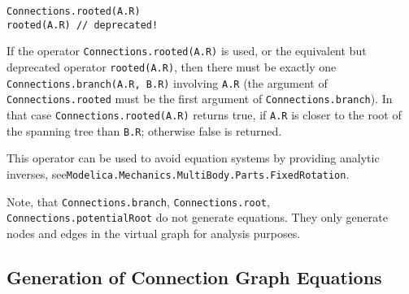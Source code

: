 \begin{operatordefinition}
\begin{synopsis}\begin{lstlisting}
Connections.rooted(A.R)
rooted(A.R) // deprecated!
\end{lstlisting}\end{synopsis}
\begin{semantics}
If the operator \lstinline!Connections.rooted(A.R)! is used, or the equivalent but deprecated operator \lstinline!rooted(A.R)!, then there must be exactly one \lstinline!Connections.branch(A.R, B.R)! involving \lstinline!A.R! (the argument of \lstinline!Connections.rooted! must be the first argument of \lstinline!Connections.branch!).
In that case \lstinline!Connections.rooted(A.R)! returns true, if \lstinline!A.R! is closer to the root of the spanning tree than \lstinline!B.R!; otherwise false is returned.

\begin{nonnormative}
This operator can be used to avoid equation systems by providing analytic inverses, see\linebreak[4] \lstinline!Modelica.Mechanics.MultiBody.Parts.FixedRotation!.
\end{nonnormative}
\end{semantics}
\end{operatordefinition}

\begin{nonnormative}
Note, that \lstinline!Connections.branch!, \lstinline!Connections.root!, \lstinline!Connections.potentialRoot! do not generate equations.
They only generate nodes and edges in the virtual graph for analysis purposes.
\end{nonnormative}


\subsection{Generation of Connection Graph Equations}\label{generation-of-connection-graph-equations}

